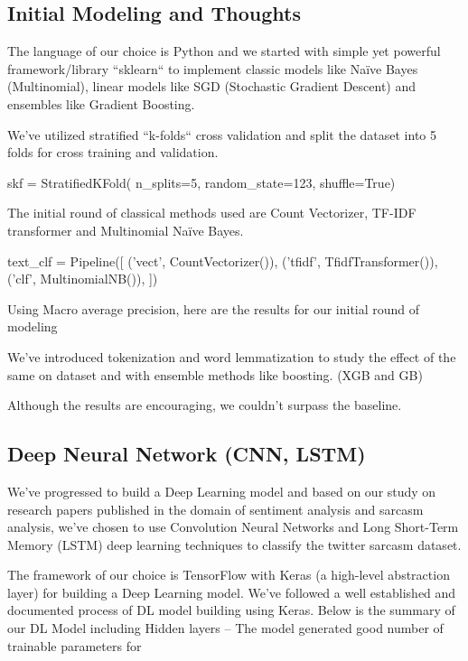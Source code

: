 \documentclass[conference]{IEEEtran}
\begin{document}
\subsection{Initial Modeling and Thoughts}
The language of our choice is Python and we started with simple yet powerful framework/library ``sklearn`` to implement classic models like Naïve Bayes (Multinomial), linear models like SGD (Stochastic Gradient Descent) and ensembles like Gradient Boosting.

We’ve utilized stratified ``k-folds`` cross validation and split the dataset into 5 folds for cross training and validation. 

\begin{verbatimtab}[4]
skf = StratifiedKFold(
	n_splits=5,
	random_state=123,
	shuffle=True)
\end{verbatimtab}

The initial round of classical methods used are Count Vectorizer, TF-IDF transformer and Multinomial Naïve Bayes.

\begin{verbatimtab}[4]
text_clf = Pipeline([
    ('vect', CountVectorizer()),
    ('tfidf', TfidfTransformer()),
    ('clf', MultinomialNB()),
])
\end{verbatimtab}

Using Macro average precision, here are the results for our initial round of modeling

We’ve introduced tokenization and word lemmatization to study the effect of the same on dataset and with ensemble methods like boosting. (XGB and GB)

Although the results are encouraging, we couldn’t surpass the baseline.

\subsection{Deep Neural Network (CNN, LSTM)}

We’ve progressed to build a Deep Learning model and based on our study on research papers published in the domain of sentiment analysis and sarcasm analysis, we’ve chosen to use Convolution Neural Networks and Long Short-Term Memory (LSTM) deep learning techniques to classify the twitter sarcasm dataset.

The framework of our choice is TensorFlow with Keras (a high-level abstraction layer) for building a Deep Learning model. We’ve followed a well established and documented process of DL model building using Keras. Below is the summary of our DL Model including Hidden layers – The model generated good number of trainable parameters for 
\end{document}
